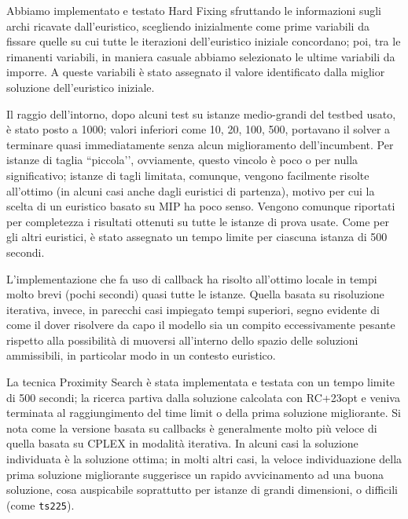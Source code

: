 Abbiamo implementato e testato Hard Fixing sfruttando le informazioni sugli archi ricavate dall’euristico, scegliendo inizialmente come prime variabili da fissare quelle su cui tutte le iterazioni dell'euristico iniziale concordano; poi, tra le rimanenti variabili, in maniera casuale abbiamo selezionato le ultime variabili da imporre. A queste variabili è stato assegnato il valore identificato dalla miglior soluzione dell’euristico iniziale.

Il raggio dell’intorno, dopo alcuni test su istanze medio-grandi del testbed usato, è stato posto a 1000; valori inferiori come 10, 20, 100, 500, portavano il solver a terminare quasi immediatamente senza alcun miglioramento dell’incumbent. Per istanze di taglia ``piccola’’, ovviamente, questo vincolo è poco o per nulla significativo; istanze di tagli limitata, comunque, vengono facilmente risolte all’ottimo (in alcuni casi anche dagli euristici di partenza), motivo per cui la scelta di un euristico basato su MIP ha poco senso. Vengono comunque riportati per completezza i risultati ottenuti su tutte le istanze di prova usate. Come per gli altri euristici, è stato assegnato un tempo limite per ciascuna istanza di 500 secondi.

L’implementazione che fa uso di callback ha risolto all’ottimo locale in tempi molto brevi (pochi secondi) quasi tutte le istanze. Quella basata su risoluzione iterativa, invece, in parecchi casi impiegato tempi superiori, segno evidente di come il dover risolvere da capo il modello sia un compito eccessivamente pesante rispetto alla possibilità di muoversi all’interno dello spazio delle soluzioni ammissibili, in particolar modo in un contesto euristico.


La tecnica Proximity Search è stata implementata e testata con un tempo limite di 500 secondi; la ricerca partiva dalla soluzione calcolata con RC+23opt e veniva terminata al raggiungimento del time limit o della prima soluzione migliorante. Si nota come la versione basata su callbacks è generalmente molto più veloce di quella basata su CPLEX in modalità iterativa. In alcuni casi la soluzione individuata è la soluzione ottima; in molti altri casi, la veloce individuazione della prima soluzione migliorante suggerisce un rapido avvicinamento ad una buona soluzione, cosa auspicabile soprattutto per istanze di grandi dimensioni, o difficili (come \texttt{ts225}).

